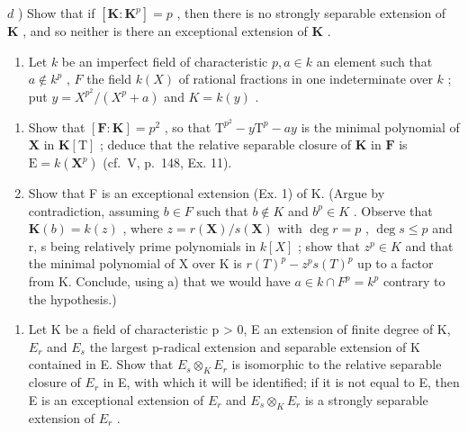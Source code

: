 \(d\) ) Show that if \([\mathbf{K}:\mathbf{K}^p ] = p\) , then there is no strongly separable extension of \(\mathbf{K}\) , and so neither is there an exceptional extension of \(\mathbf{K}\) .

\begin{enumerate}
\def\labelenumi{\arabic{enumi})}
\setcounter{enumi}{1}
\tightlist
\item
  Let \(k\) be an imperfect field of characteristic \(p, a \in k\) an element such that \(a \notin k^p\) , \(F\) the field \(k(X)\) of rational fractions in one indeterminate over \(k\) ; put \(y = X^{p^2} / (X^p + a)\) and \(K = k(y)\) .
\end{enumerate}

\begin{enumerate}
\def\labelenumi{\alph{enumi})}
\item
  Show that \([\mathbf{F}:\mathbf{K}] = p^2\) , so that \(\mathrm{T}^{p^2} - y\mathrm{T}^p - ay\) is the minimal polynomial of \(\mathbf{X}\) in \(\mathbf{K}[\mathrm{T}]\) ; deduce that the relative separable closure of \(\mathbf{K}\) in \(\mathbf{F}\) is \(\mathrm{E} = k(\mathbf{X}^p)\) (cf.~V, p.~148, Ex. 11).
\item
  Show that F is an exceptional extension (Ex. 1) of K. (Argue by contradiction, assuming \(b \in F\) such that \(b \notin K\) and \(b^{p} \in K\) . Observe that \(\mathbf{K}(b) = k(z)\) , where \(z = r(\mathbf{X}) / s(\mathbf{X})\) with \(\deg r = p\) , \(\deg s \leqslant p\) and r, s being relatively prime polynomials in \(k[X]\) ; show that \(z^{p} \in K\) and that the minimal polynomial of X over K is \(r(T)^{p} - z^{p}s(T)^{p}\) up to a factor from K. Conclude, using a) that we would have \(a \in k \cap F^{p} = k^{p}\) contrary to the hypothesis.)
\end{enumerate}

\begin{enumerate}
\def\labelenumi{\arabic{enumi})}
\setcounter{enumi}{2}
\tightlist
\item
  Let K be a field of characteristic p \textgreater{} 0, E an extension of finite degree of K, \(E_{r}\) and \(E_{s}\) the largest p-radical extension and separable extension of K contained in E. Show that \(E_{s} \otimes_{K} E_{r}\) is isomorphic to the relative separable closure of \(E_{r}\) in E, with which it will be identified; if it is not equal to E, then E is an exceptional extension of \(E_{r}\) and \(E_{s} \otimes_{K} E_{r}\) is a strongly separable extension of \(E_{r}\) .
\end{enumerate}

